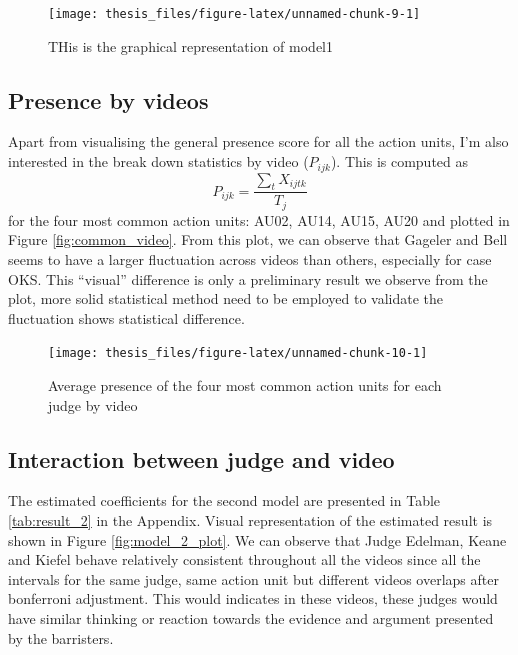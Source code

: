 \documentclass{monashthesis}
\begin{document}
\begin{figure}
\texttt{[image: thesis\_files/figure-latex/unnamed-chunk-9-1]} \caption{THis is the graphical representation of model1\label{fig:model_1_plot}}\label{fig:unnamed-chunk-9}
\end{figure}

\hypertarget{presence-by-videos}{%
\subsection{Presence by videos}\label{presence-by-videos}}

Apart from visualising the general presence score for all the action units, I'm also interested in the break down statistics by video (\(P_{ijk}\)). This is computed as \[P_{ijk} = \frac{\sum_{t}X_{ijtk}}{T_j}\] for the four most common action units: AU02, AU14, AU15, AU20 and plotted in Figure \ref{fig:common_video}. From this plot, we can observe that Gageler and Bell seems to have a larger fluctuation across videos than others, especially for case OKS. This ``visual'' difference is only a preliminary result we observe from the plot, more solid statistical method need to be employed to validate the fluctuation shows statistical difference.

\begin{figure}
\texttt{[image: thesis\_files/figure-latex/unnamed-chunk-10-1]} \caption{Average presence of the four most common action units for each judge by video\label{fig:common_video}}\label{fig:unnamed-chunk-10}
\end{figure}

\hypertarget{interaction-between-judge-and-video}{%
\subsection{Interaction between judge and video}\label{interaction-between-judge-and-video}}

The estimated coefficients for the second model are presented in Table \ref{tab:result_2} in the Appendix. Visual representation of the estimated result is shown in Figure \ref{fig:model_2_plot}. We can observe that Judge Edelman, Keane and Kiefel behave relatively consistent throughout all the videos since all the intervals for the same judge, same action unit but different videos overlaps after bonferroni adjustment. This would indicates in these videos, these judges would have similar thinking or reaction towards the evidence and argument presented by the barristers.
\end{document}
